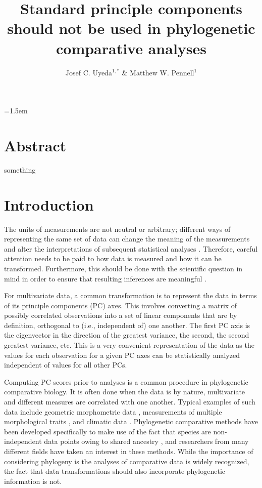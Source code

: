 \documentclass[a4paper,12pt]{article}
\title{Standard principle components should not be used in phylogenetic comparative analyses}
\author{
Josef C. Uyeda$^{1,*}$ \& Matthew W. Pennell$^1$
}
\date{}
\affiliation{
 $^{1}$ Department of Biological Sciences \& Institute for Bioinformatics and Evolutionary Studies, University of Idaho, Moscow, ID 83844, U.S.A.\\ 
 $^{*}$ Email for correspondence: \texttt{uyedaj@uidaho.edu}\\
}
\begin{document}
\mstitlepage
\parindent=1.5em
\addtolength{\parskip}{.3em}
\vfill

\section{Abstract}
something
\vfill

\newpage

\section{Introduction}
The units of measurements are not neutral or arbitrary; different ways of representing the same set of data can change the meaning of the measurements and alter the interpretations of subsequent statistical analyses \citep{Hand2004, HansenHoule2008, Houle2011}. Therefore, careful attention needs to be paid to how data is measured and how it can be transformed. Furthermore, this should be done with the scientific question in mind in order to ensure that resulting inferences are meaningful \citep{Houle2011}. 

For multivariate data, a common transformation is to represent the data in terms of its principle components (PC) axes. This involves converting a matrix of possibly correlated observations into a set of linear components that are by definition, orthogonal to (i.e., independent of) one another. The first PC axis is the eigenvector in the direction of the greatest variance, the second, the second greatest variance, etc. This is a very convenient representation of the data as the values for each observation for a given PC axes can be statistically analyzed independent of values for all other PCs. 

Computing PC scores prior to analyses is a common procedure in phylogenetic comparative biology. It is often done when the data is by nature, multivariate and different measures are correlated with one another. Typical examples of such data include geometric morphometric data \citep[e.g.,][]{Hunt2013}, measurements of multiple morphological traits \citep[e.g.,][]{Harmon2010, BergmannIrshick2012, Weir2012, VidalGarcia2013, Pineear2013}, and climatic data \citep[e.g.,][]{KozakWeins2010, Schnitzler2012}. Phylogenetic comparative methods \citep[PCMs; recently reviewed in][]{Omeara2012, PennellHarmon} have been developed specifically to make use of the fact that species are non-independent data points owing to shared ancestry \citep{Felsenstein1985}, and researchers from many different fields have taken an interest in these methods. While the importance of considering phylogeny is the analyses of comparative data is widely recognized, the fact that data transformations should also incorporate phylogenetic information is not.
\end{document}
